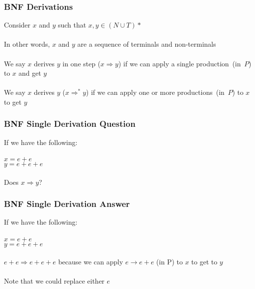 \documentclass[aspectratio=169]{beamer}
\begin{document}
\begin{frame}
\frametitle{BNF Derivations}

Consider $x$ and $y$ such that $x, y \in (N \cup T)*$\\~\\

In other words, $x$ and $y$ are a sequence of terminals and non-terminals\\~\\

We say $x$ derives $y$ in one step ($x \Rightarrow y$) if we can apply a
single \alert{production}~(in~$P$) to $x$ and get $y$\\~\\

We say $x$ derives $y$ ($x \Rightarrow^* y$) if we can apply one or more
\alert{productions}~(in~$P$) to $x$ to get $y$
\end{frame}

\begin{frame}
\frametitle{BNF Single Derivation Question}

If we have the following:\\~\\

$x = e + e$\\
$y = e + e + e$\\~\\

Does $x \Rightarrow y$? 
\end{frame}

\begin{frame}
\frametitle{BNF Single Derivation Answer}

If we have the following:\\~\\

$x = e + e$\\
$y = e + e + e$\\~\\

$e + e \Rightarrow e + e + e$ because we can apply $e \rightarrow e + e$ (in P)
to $x$ to get to $y$\\~\\

Note that we could replace either $e$
\end{frame}
\end{document}
